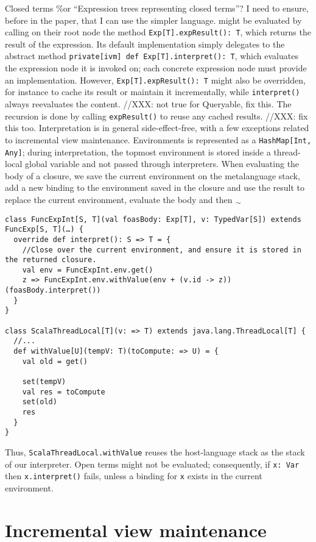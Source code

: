 \documentclass{article}
\newcommand{\textsubscr}[1]{\ensuremath{_{\scriptsize\textrm{#1}}}}
\begin{document}
Closed terms \%or ``Expression trees representing closed terms''? I need
to ensure, before in the paper, that I can use the simpler language.
might be evaluated by calling on their root node the method
\texttt{Exp{[}T{]}.expResult(): T}, which returns the result of the
expression. Its default implementation simply delegates to the abstract
method \texttt{private{[}ivm{]} def Exp{[}T{]}.interpret(): T}, which
evaluates the expression node it is invoked on; each concrete expression
node must provide an implementation. However,
\texttt{Exp{[}T{]}.expResult(): T} might also be overridden, for
instance to cache its result or maintain it incrementally, while
\texttt{interpret()} always reevaluates the content. //XXX: not true for
Queryable, fix this. The recursion is done by calling
\texttt{expResult()} to reuse any cached results. //XXX: fix this too.
Interpretation is in general side-effect-free, with a few exceptions
related to incremental view maintenance. Environments is represented as
a \texttt{HashMap{[}Int, Any{]}}; during interpretation, the topmost
environment is stored inside a thread-local global variable and not
passed through interpreters. When evaluating the body of a closure, we
save the current environment on the metalanguage stack, add a new
binding to the environment saved in the closure and use the result to
replace the current environment, evaluate the body and then
\textsubscr{\ensuremath{\sim}}
\begin{verbatim}
class FuncExpInt[S, T](val foasBody: Exp[T], v: TypedVar[S]) extends FuncExp[S, T](…) {
  override def interpret(): S => T = {
    //Close over the current environment, and ensure it is stored in the returned closure.
    val env = FuncExpInt.env.get()
    z => FuncExpInt.env.withValue(env + (v.id -> z))(foasBody.interpret())
  }
}

class ScalaThreadLocal[T](v: => T) extends java.lang.ThreadLocal[T] {
  //...
  def withValue[U](tempV: T)(toCompute: => U) = {
    val old = get()

    set(tempV)
    val res = toCompute
    set(old)
    res
  }
}
\end{verbatim}
Thus,
\texttt{ScalaThreadLocal.withValue} reuses the host-language stack as
the stack of our interpreter. Open terms might not be evaluated;
consequently, if \texttt{x: Var} then \texttt{x.interpret()} fails,
unless a binding for \texttt{x} exists in the current environment.

\section{Incremental view maintenance}
\end{document}
